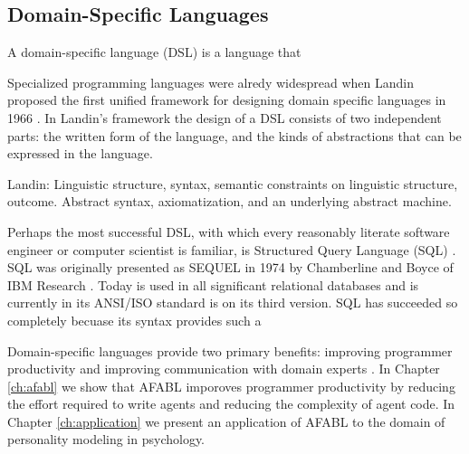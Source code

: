 \cite{polancic2010a-an-empirical}


\subsection{Domain-Specific Languages}

A domain-specific language (DSL) is a language that

Specialized programming languages were alredy widespread when Landin proposed the first unified framework for designing domain specific languages in 1966 \cite{landin1966next}. In Landin's framework the design of a DSL consists of two independent parts: the written form of the language, and the kinds of abstractions that can be expressed in the language.

Landin: Linguistic structure, syntax, semantic constraints on linguistic structure, outcome. Abstract syntax, axiomatization, and an underlying abstract machine.

Perhaps the most successful DSL, with which every reasonably literate software engineer or computer scientist is familiar, is Structured Query Language (SQL) \cite{}. SQL was originally presented as SEQUEL in 1974 by Chamberline and Boyce of IBM Research \cite{chamberlin1974sequel}. Today is used in all significant relational databases and is currently in its ANSI/ISO standard is on its third version. SQL has succeeded so completely becuase its syntax provides such a

Domain-specific languages provide two primary benefits: improving programmer productivity and improving communication with domain experts \cite{fowler2011domain}. In Chapter \ref{ch:afabl} we show that AFABL imporoves programmer productivity by reducing the effort required to write agents and reducing the complexity of agent code. In Chapter \ref{ch:application} we present an application of AFABL to the domain of personality modeling in psychology.

\cite{hudak1996building}
\cite{hudak1998modular}


\cite{lorenz2011a-code}


\cite{taha2008domain-specific}


\cite{deursen2000domain-specific}


\cite{dmitriev2004a-language}





\cite{mitchell1993on-abstraction}


\cite{odersky2008programming}


